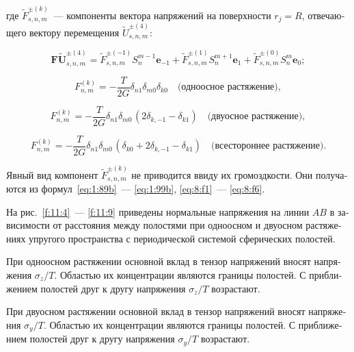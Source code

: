 \begin{russian}
\noindent где $\tilde F_{s,n,m}^{\pm(k)}$~--- компоненты вектора напряжений на поверхности $r_j=R$, отвечающего вектору перемещения $\tilde U_{s,n,m}^{\pm(4)}$:

$$
\mathbf{F\tilde U}_{s,n,m}^{\pm(4)}=\tilde F_{s,n,m}^{\pm(-1)}S_n^{m-1}\mathbf{e}_{-1}+\tilde F_{s,n,m}^{\pm(1)}S_n^{m+1}\mathbf{e}_1+\tilde F_{s,n,m}^{\pm(0)}S_n^m\mathbf{e}_0;
$$

\begin{equation*}
F_{n,m}^{(k)} =  -\frac{T}{2G}{\delta _{n1}}{\delta _{m0}}{\delta _{k0}}\quad\text{(одноосное растяжение)},
\label{eq:11:19}
\end{equation*}

\begin{equation*}
F_{n,m}^{(k)} =  -\frac{T}{2G}{\delta _{n1}}{\delta _{m0\,}}(2{\delta _{k, - 1}} - {\delta _{k1}})\quad\text{(двуосное растяжение)},
\label{eq:11:20}
\end{equation*}

\begin{equation*}
F_{n,m}^{(k)} =  -\frac{T}{2G}{\delta _{n1}}{\delta _{m0\,}}(\delta_{k0}+2{\delta _{k, - 1}} - {\delta _{k1}})\quad\text{(всестороннее растяжение)}.
\label{eq:11:21}
\end{equation*}

Явный вид компонент $\tilde F_{s,n,m}^{\pm(k)}$ не приводится ввиду их громоздкости. Они получаются из формул~\eqref{eq:1:89b}~--- \eqref{eq:1:99b}, \eqref{eq:8:f1}~--- \eqref{eq:8:f6}.

На рис.~\ref{f:11:4}~--- \ref{f:11:9} приведены нормальные напряжения на линии $AB$ в зависимости от расстояния между полостями при одноосном и двуосном растяжениях упругого пространства с периодической системой сферических полостей.

При одноосном растяжении основной вклад в тензор напряжений вносят напряжения $\sigma_z/T$. Областью их концентрации являются границы полостей. С приближением полостей друг к другу напряжения $\sigma_z/T$ возрастают.

При двуосном растяжении основной вклад в тензор напряжений вносят напряжения $\sigma_y/T$. Областью их концентрации являются границы полостей. С приближением полостей друг к другу напряжения $\sigma_y/T$ возрастают.


\end{russian}
